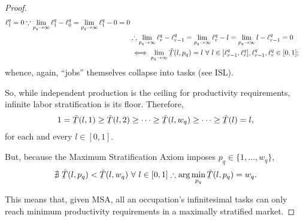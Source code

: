 \documentclass[hidelinks, nonatbib]{elsarticle}
\begin{document}
\begin{lemma}
\begin{proof}
\begin{align}
            \ell_{1}^{q}
            = 0
            \because
            \lim_{p_q \rightarrow \infty}
            \ell_{1}^{q} - 
            \ell_{0}^{q}
            =
            \lim_{p_q \rightarrow \infty}
            \ell_{1}^{q} - 
            0
            = 0
            \\
            &
            \therefore
            \lim_{p_q \rightarrow \infty}{
                \ell_{r}^{q} - \ell_{r-1}^{q}
            }
            =
            \lim_{p_q \rightarrow \infty}{
                \ell_{r}^{q} - l
            }
            =
            \lim_{p_q \rightarrow \infty}{
                l - \ell_{r-1}^{q}
            }
            =
            0
            \\
            &
            \iff
            \lim_{p_q \rightarrow \infty}{
                \underaccent{\bar}{\tilde{T}}(l, p_q)
            }
            =
            l
            \
            \forall
            \
            l \in
            [\ell_{r-1}^{q}, \ell_{r}^{q}],
            \ell_{r-1}^{q}, \ell_{r}^{q}
            \in [0,1]
            ;
        \end{align}
        whence, again, ``jobs'' themselves collapse into tasks (see ISL).

        So, while independent production is the ceiling for productivity requirements, infinite labor stratification is its floor. Therefore,
        \begin{gather}
            1
            =
            \underaccent{\bar}{\tilde{T}}(l, 1)
            \geq
            \underaccent{\bar}{\tilde{T}}(l, 2)
            \geq
            \dots
            \geq
            \underaccent{\bar}{\tilde{T}}(l, w_q)
            \geq
            \dots
            \geq
            \underaccent{\bar}{\tilde{T}}(l)
            =
            l
            ,
        \end{gather}
        for each and every $l \in [0,1]$. 

        But, because the Maximum Stratification Axiom imposes $p_q \in \{1,\dots, w_q \}$,
        \begin{gather}
            \nexists \
            \underaccent{\bar}{\tilde{T}}(l, p_q)
            <
            \underaccent{\bar}{\tilde{T}}(l, w_q)
            \
            \forall
            \
            l \in [0,1]
            \therefore
            \arg\min_{p_q}{
                \underaccent{\bar}{\tilde{T}}(l, p_q)
            }
            = w_q
            .
        \end{gather}

        This means that, given MSA, all an occupation's infinitesimal tasks can only reach minimum productivity requirements in a maximally stratified  market.
    \end{proof}
\end{lemma}
\end{document}
